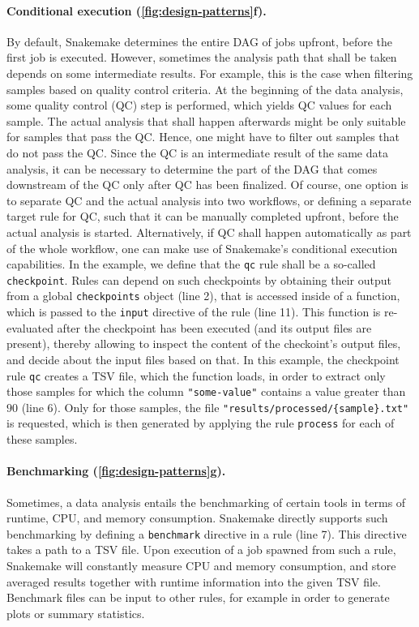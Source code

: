 \documentclass[10pt,a4paper,twocolumn]{article}
\begin{document}
\paragraph{Conditional execution (\autoref{fig:design-patterns}f).}
By default, Snakemake determines the entire DAG of jobs upfront, before the first job is executed.
However, sometimes the analysis path that shall be taken depends on some intermediate results.
For example, this is the case when filtering samples based on quality control criteria.
At the beginning of the data analysis, some quality control (QC) step is performed, which yields QC values for each sample.
The actual analysis that shall happen afterwards might be only suitable for samples that pass the QC.
Hence, one might have to filter out samples that do not pass the QC.
Since the QC is an intermediate result of the same data analysis, it can be necessary to determine the part of the DAG that comes downstream of the QC only after QC has been finalized.
Of course, one option is to separate QC and the actual analysis into two workflows, or defining a separate target rule for QC, such that it can be manually completed upfront, before the actual analysis is started.
Alternatively, if QC shall happen automatically as part of the whole workflow, one can make use of Snakemake's conditional execution capabilities.
In the example, we define that the \lstinline!qc! rule shall be a so-called \lstinline!checkpoint!.
Rules can depend on such checkpoints by obtaining their output from a global \lstinline!checkpoints! object (line 2), that is accessed inside of a function, which is passed to the \lstinline!input! directive of the rule (line 11).
This function is re-evaluated after the checkpoint has been executed (and its output files are present), thereby allowing to inspect the content of the checkoint's output files, and decide about the input files based on that.
In this example, the checkpoint rule \lstinline!qc! creates a TSV file, which the function loads, in order to extract only those samples for which the column \lstinline!"some-value"! contains a value greater than $90$ (line 6).
Only for those samples, the file \lstinline!"results/processed/{sample}.txt"! is requested, which is then generated by applying the rule \lstinline!process! for each of these samples.

\paragraph{Benchmarking (\autoref{fig:design-patterns}g).}
Sometimes, a data analysis entails the benchmarking of certain tools in terms of runtime, CPU, and memory consumption.
Snakemake directly supports such benchmarking by defining a \lstinline!benchmark! directive in a rule (line 7).
This directive takes a path to a TSV file.
Upon execution of a job spawned from such a rule, Snakemake will constantly measure CPU and memory consumption, and store averaged results together with runtime information into the given TSV file.
Benchmark files can be input to other rules, for example in order to generate plots or summary statistics.
\end{document}

